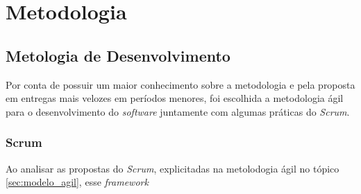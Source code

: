 \chapter[Metodologia]{Metodologia}
\label{cp:metodologia}

\section{Metologia de Desenvolvimento}

Por conta de possuir um maior conhecimento sobre a metodologia e pela proposta em entregas mais velozes em períodos menores, foi escolhida a metodologia ágil para o desenvolvimento do \textit{software} juntamente com algumas práticas do \textit{Scrum}. 

\subsection{Scrum}

Ao analisar as propostas do \textit{Scrum}, explicitadas na metolodogia ágil no tópico \ref{sec:modelo_agil}, esse \textit{framework} 